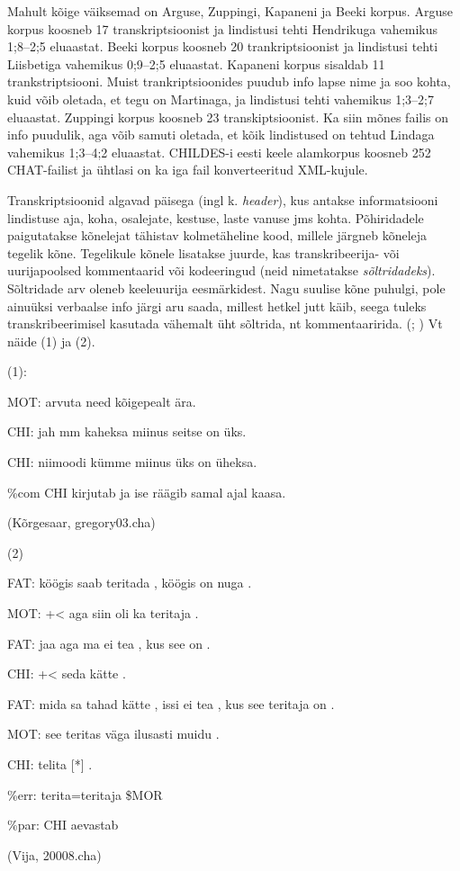 \documentclass[12pt]{article}
\begin{document}
Mahult kõige väiksemad on Arguse, Zuppingi, Kapaneni ja Beeki korpus. Arguse korpus koosneb 17 transkriptsioonist ja lindistusi tehti Hendrikuga vahemikus 1;8--2;5 eluaastat. Beeki korpus koosneb 20 trankriptsioonist ja lindistusi tehti Liisbetiga vahemikus 0;9--2;5 eluaastat. Kapaneni korpus sisaldab 11 trankstriptsiooni. Muist trankriptsioonides puudub info lapse nime ja soo kohta, kuid võib oletada, et tegu on Martinaga, ja lindistusi tehti vahemikus 1;3--2;7 eluaastat. Zuppingi korpus koosneb 23 transkiptsioonist. Ka siin mõnes failis on info puudulik, aga võib samuti oletada, et kõik lindistused on tehtud Lindaga vahemikus 1;3--4;2 eluaastat. CHILDES-i eesti keele alamkorpus koosneb 252 CHAT-failist ja ühtlasi on ka iga fail konverteeritud XML-kujule.

Transkriptsioonid algavad päisega (ingl k. \emph{header}), kus antakse informatsiooni lindistuse aja, koha, osalejate, kestuse, laste vanuse jms kohta. Põhiridadele paigutatakse kõnelejat tähistav kolmetäheline kood, millele järgneb  kõneleja tegelik kõne. Tegelikule kõnele lisatakse juurde, kas transkribeerija- või uurijapoolsed kommentaarid või kodeeringud (neid nimetatakse \emph{sõltridadeks}). Sõltridade arv oleneb keeleuurija eesmärkidest. Nagu suulise kõne puhulgi, pole ainuüksi verbaalse info järgi aru saada, millest hetkel jutt käib, seega tuleks transkribeerimisel kasutada vähemalt üht sõltrida, nt kommentaaririda. (\citealp[68]{Argus2007}; \citealp{CHAT}) Vt näide (1) ja (2).
\hfill

(1):
\begin{description}
    \item*MOT: arvuta need kõigepealt ära.
    \item*CHI: jah mm kaheksa miinus seitse on üks.
    \item*CHI: niimoodi kümme miinus üks on üheksa.
    \item\%com CHI kirjutab ja ise räägib samal ajal kaasa.
    \item(Kõrgesaar, gregory03.cha)
\end{description}
\hfill

(2)
\begin{description}
    \item*FAT:   köögis saab teritada , köögis on nuga .
    \item*MOT:   +< aga siin oli ka teritaja .
    \item*FAT:   jaa aga ma ei tea , kus see on .
    \item*CHI:   +< seda kätte .
    \item*FAT:   mida sa tahad kätte , issi ei tea , kus see teritaja on .
    \item*MOT:   see teritas väga ilusasti muidu .
    \item*CHI:   telita [*] .
    \item\%err:   terita=teritaja \$MOR
    \item\%par:   CHI aevastab
    \item(Vija, 20008.cha)
\end{description}
\end{document}
